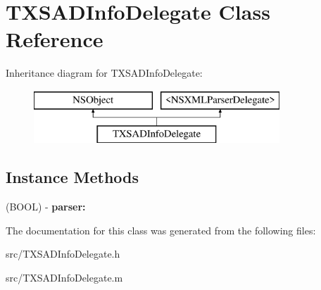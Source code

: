 \hypertarget{interface_t_x_s_a_d_info_delegate}{}\section{T\+X\+S\+A\+D\+Info\+Delegate Class Reference}
\label{interface_t_x_s_a_d_info_delegate}
Inheritance diagram for T\+X\+S\+A\+D\+Info\+Delegate\+:\begin{figure}[H]
\begin{center}
\leavevmode
\includegraphics[height=2.000000cm]{interface_t_x_s_a_d_info_delegate}
\end{center}
\end{figure}
\subsection*{Instance Methods}
\begin{DoxyCompactItemize}
\item 
\hypertarget{interface_t_x_s_a_d_info_delegate_a58237e9110ce0d9bd1317c014c6c597b}{}(B\+O\+O\+L) -\/ {\bfseries parser\+:}\label{interface_t_x_s_a_d_info_delegate_a58237e9110ce0d9bd1317c014c6c597b}

\end{DoxyCompactItemize}


The documentation for this class was generated from the following files\+:\begin{DoxyCompactItemize}
\item 
src/T\+X\+S\+A\+D\+Info\+Delegate.\+h\item 
src/T\+X\+S\+A\+D\+Info\+Delegate.\+m\end{DoxyCompactItemize}
